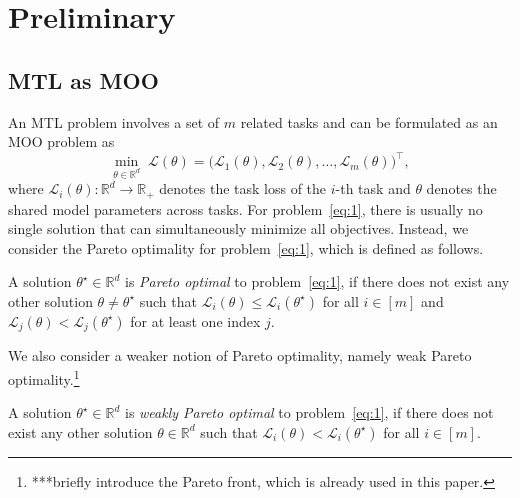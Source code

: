 \documentclass[sigconf]{acmart}
\begin{document}
\section{Preliminary}
\subsection{MTL as MOO}
An MTL problem involves a set of $m$ related tasks and can be formulated as an MOO problem as
\begin{equation}
    {\min}_{\theta\in \mathbb{R}^d} \; \boldsymbol{\mathcal{L}}(\theta)
    = \bigl( \mathcal{L}_1(\theta), \mathcal{L}_2(\theta), \ldots, \mathcal{L}_m(\theta) \bigr)^\top,
    \label{eq:1}
\end{equation}
where $\mathcal{L}_i(\theta):\mathbb{R}^d\to\mathbb{R}_+$ denotes the task loss of the $i$-th task and $\theta$ denotes the shared model parameters across tasks. %
For problem~\eqref{eq:1}, there is usually no single solution that can simultaneously minimize all objectives. Instead, we consider the Pareto optimality for problem~\eqref{eq:1}, which is defined as follows.
\begin{definition}\label{def:pareto_opt}
A solution $\theta^\star \in \mathbb{R}^d$ is \emph{Pareto optimal} to problem~\eqref{eq:1}, if there does not exist any other solution $\theta \neq \theta^\star$ such that $\mathcal{L}_i(\theta) \le \mathcal{L}_i(\theta^\star)$ for all $i \in [m]$ and $\mathcal{L}_j(\theta) < \mathcal{L}_j(\theta^\star)$ for at least one index $j$.
\end{definition}

 We also consider a weaker notion of Pareto optimality, namely weak Pareto optimality.\footnote{***briefly introduce the Pareto front, which is already used in this paper.}

\begin{definition}\label{def:weak_pareto_opt}
A solution $\theta^\star \in \mathbb{R}^d$ is \emph{weakly Pareto optimal} to problem~\eqref{eq:1}, if there does not exist any other solution $\theta \in \mathbb{R}^d$ such that $\mathcal{L}_i(\theta) < \mathcal{L}_i(\theta^\star)$ for all $i \in [m]$.
\end{definition}
\end{document}
